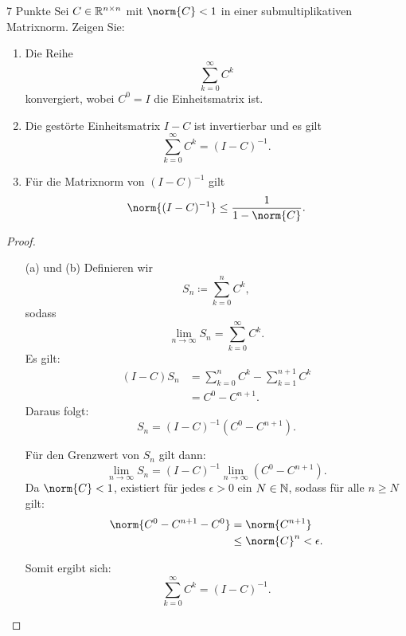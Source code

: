 \documentclass{problemset}
\begin{document}
\begin{problem}{7 Punkte}
Sei \( C \in \mathbb{R}^{n \times n} \) mit \( \norm{C} < 1 \) in einer
submultiplikativen Matrixnorm. Zeigen Sie:
\begin{enumerate}
    \item Die Reihe
          \[
              \sum_{k=0}^\infty C^k
          \]
          konvergiert, wobei \( C^0 = I \) die Einheitsmatrix ist.
    \item Die gestörte Einheitsmatrix \( I - C \) ist invertierbar und es gilt
          \[
              \sum_{k=0}^\infty C^k = (I - C)^{-1}.
          \]
    \item Für die Matrixnorm von \( (I - C)^{-1} \) gilt
          \[
              \norm{(I - C)^{-1}} \leq \frac{1}{1 - \norm{C}}.
          \]
\end{enumerate}
\begin{proof} \leavevmode
    \begin{enumerate}
        \item[(a) und (b)] Definieren wir
              \[
                  S_n \coloneq \sum_{k=0}^n C^k,
              \]
              sodass
              \[
                  \lim_{n \to \infty} S_n = \sum_{k=0}^\infty C^k.
              \]
              Es gilt:
              \begin{align*}
                  (I - C) S_n & = \sum_{k=0}^n C^k - \sum_{k=1}^{n + 1} C^k \\
                              & = C^0 - C^{n+1}.
              \end{align*}
              Daraus folgt:
              \[
                  S_n = (I - C)^{-1} (C^0 - C^{n+1}).
              \]

              Für den Grenzwert von \( S_n \) gilt dann:
              \[
                  \lim_{n \to \infty} S_n = (I - C)^{-1} \lim_{n \to \infty} (C^0 - C^{n+1}).
              \]
              Da \( \norm{C} < 1 \), existiert für jedes \( \epsilon > 0 \) ein
              \( N \in \mathbb{N} \), sodass für alle \( n \geq N \) gilt:
              \begin{align*}
                  \norm{C^0 - C^{n+1} - C^0} & = \norm{C^{n+1}}            \\
                                             & \leq \norm{C}^n < \epsilon.
              \end{align*}

              Somit ergibt sich:
              \[
                  \sum_{k=0}^\infty C^k = (I - C)^{-1}.
              \]


\end{enumerate}
\end{proof}
\end{problem}
\end{document}
